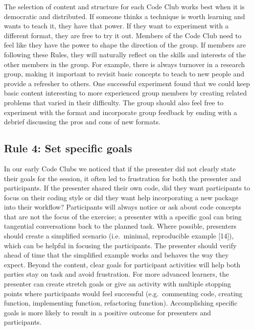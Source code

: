 \documentclass[
  11pt,
]{article}
\begin{document}
The selection of content and structure for each Code Club works best
when it is democratic and distributed. If someone thinks a technique is
worth learning and wants to teach it, they have that power. If they want
to experiment with a different format, they are free to try it out.
Members of the Code Club need to feel like they have the power to shape
the direction of the group. If members are following these Rules, they
will naturally reflect on the skills and interests of the other members
in the group. For example, there is always turnover in a research group,
making it important to revisit basic concepts to teach to new people and
provide a refresher to others. One successful experiment found that we
could keep basic content interesting to more experienced group members
by creating related problems that varied in their difficulty. The group
should also feel free to experiment with the format and incorporate
group feedback by ending with a debrief discussing the pros and cons of
new formats.

\hypertarget{rule-4-set-specific-goals}{%
\subsection{Rule 4: Set specific
goals}\label{rule-4-set-specific-goals}}

In our early Code Clubs we noticed that if the presenter did not clearly
state their goals for the session, it often led to frustration for both
the presenter and participants. If the presenter shared their own code,
did they want participants to focus on their coding style or did they
want help incorporating a new package into their workflow? Participants
will always notice or ask about code concepts that are not the focus of
the exercise; a presenter with a specific goal can bring tangential
conversations back to the planned task. Where possible, presenters
should create a simplified scenario (i.e.~minimal, reproducible example
{[}14{]}), which can be helpful in focusing the participants. The
presenter should verify ahead of time that the simplified example works
and behaves the way they expect. Beyond the content, clear goals for
participant activities will help both parties stay on task and avoid
frustration. For more advanced learners, the presenter can create
stretch goals or give an activity with multiple stopping points where
participants would feel successful (e.g.~commenting code, creating
function, implementing function, refactoring function). Accomplishing
specific goals is more likely to result in a positive outcome for
presenters and participants.
\end{document}
